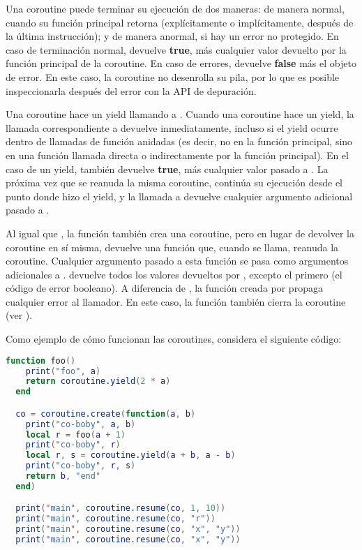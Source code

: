 Una coroutine puede terminar su ejecución de dos maneras: de manera normal, cuando su función principal retorna (explícitamente o implícitamente, después de la última instrucción); y de manera anormal, si hay un error no protegido. En caso de terminación normal,  devuelve \textbf{true}, más cualquier valor devuelto por la función principal de la coroutine. En caso de errores,  devuelve \textbf{false} más el objeto de error. En este caso, la coroutine no desenrolla su pila, por lo que es posible inspeccionarla después del error con la API de depuración.

Una coroutine hace un yield llamando a . Cuando una coroutine hace un yield, la llamada correspondiente a  devuelve inmediatamente, incluso si el yield ocurre dentro de llamadas de función anidadas (es decir, no en la función principal, sino en una función llamada directa o indirectamente por la función principal). En el caso de un yield,  también devuelve \textbf{true}, más cualquier valor pasado a . La próxima vez que se reanuda la misma coroutine, continúa su ejecución desde el punto donde hizo el yield, y la llamada a  devuelve cualquier argumento adicional pasado a .

Al igual que , la función  también crea una coroutine, pero en lugar de devolver la coroutine en sí misma, devuelve una función que, cuando se llama, reanuda la coroutine. Cualquier argumento pasado a esta función se pasa como argumentos adicionales a .  devuelve todos los valores devueltos por , excepto el primero (el código de error booleano). A diferencia de , la función creada por  propaga cualquier error al llamador. En este caso, la función también cierra la coroutine (ver ).

\vspace{5mm} %
Como ejemplo de cómo funcionan las coroutines, considera el siguiente código:

\begin{lstlisting}[language=Lua, style=mystyle]
  function foo()
    print("foo", a)
    return coroutine.yield(2 * a)
  end

  co = coroutine.create(function(a, b)
    print("co-boby", a, b)
    local r = foo(a + 1)
    print("co-boby", r)
    local r, s = coroutine.yield(a + b, a - b)
    print("co-boby", r, s)
    return b, "end"
  end)

  print("main", coroutine.resume(co, 1, 10))
  print("main", coroutine.resume(co, "r"))
  print("main", coroutine.resume(co, "x", "y"))
  print("main", coroutine.resume(co, "x", "y"))
\end{lstlisting}

